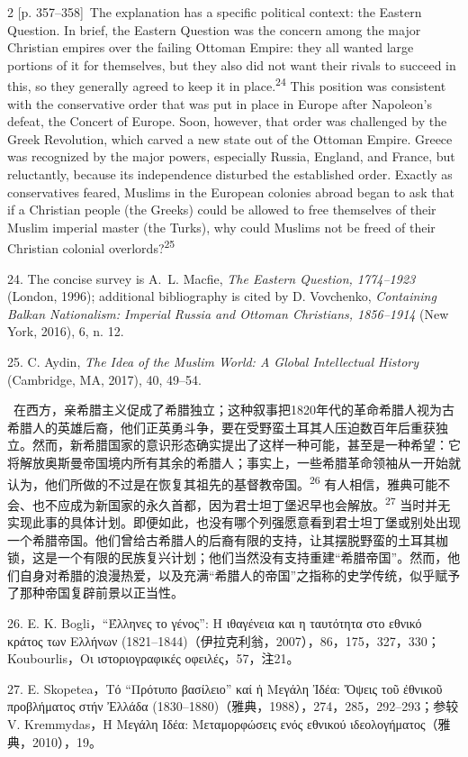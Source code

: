 \documentclass[10pt,a4paper]{article}
\begin{document}
\begin{paracol}{2}
{\scriptsize\color{gray}[p. 357–358]}\ The explanation has a specific political context: the Eastern Question. In brief, the Eastern Question was the concern among the major Christian empires over the failing Ottoman Empire: they all wanted large portions of it for themselves, but they also did not want their rivals to succeed in this, so they generally agreed to keep it in place.\nobreak\textsuperscript{24} This position was consistent with the conservative order that was put in place in Europe after Napoleon’s defeat, the Concert of Europe. Soon, however, that order was challenged by the Greek Revolution, which carved a new state out of the Ottoman Empire. Greece was recognized by the major powers, especially Russia, England, and France, but reluctantly, because its independence disturbed the established order. Exactly as conservatives feared, Muslims in the European colonies abroad began to ask that if a Christian people (the Greeks) could be allowed to free themselves of their Muslim imperial master (the Turks), why could Muslims not be freed of their Christian colonial overlords?\nobreak\textsuperscript{25}\par{\small 24. The concise survey is A. L. Macfie, \textit{The Eastern Question, 1774–1923} (London, 1996); additional bibliography is cited by D. Vovchenko, \textit{Containing Balkan Nationalism: Imperial Russia and Ottoman Christians, 1856–1914 }(New York, 2016), 6, n. 12.\par}{\small 25. C. Aydin, \textit{The Idea of the Muslim World: A Global Intellectual History} (Cambridge, MA, 2017), 40, 49–54.\par}
\switchcolumn*
{\scriptsize\color{gray}[p. 358]}\ 在西方，亲希腊主义促成了希腊独立；这种叙事把1820年代的革命希腊人视为古希腊人的英雄后裔，他们正英勇斗争，要在受野蛮土耳其人压迫数百年后重获独立。然而，新希腊国家的意识形态确实提出了这样一种可能，甚至是一种希望：它将解放奥斯曼帝国境内所有其余的希腊人；事实上，一些希腊革命领袖从一开始就认为，他们所做的不过是在恢复其祖先的基督教帝国。\nobreak\textsuperscript{26} 有人相信，雅典可能不会、也不应成为新国家的永久首都，因为君士坦丁堡迟早也会解放。\nobreak\textsuperscript{27} 当时并无实现此事的具体计划。即便如此，也没有哪个列强愿意看到君士坦丁堡或别处出现一个希腊帝国。他们曾给古希腊人的后裔有限的支持，让其摆脱野蛮的土耳其枷锁，这是一个有限的民族复兴计划；他们当然没有支持重建“希腊帝国”。然而，他们自身对希腊的浪漫热爱，以及充满“希腊人的帝国”之指称的史学传统，似乎赋予了那种帝国复辟前景以正当性。\par{\small 26. E. K. Bogli，“Έλληνες το γένος”: Η ιθαγένεια και η ταυτότητα στο εθνικό κράτος των Ελλήνων (1821–1844)（伊拉克利翁，2007），86，175，327，330；Koubourlis，Οι ιστοριογραφικές οφειλές，57，注21。\par}{\small 27. E. Skopetea，Τό “Πρότυπο βασίλειο” καί ἡ Μεγάλη Ἰδέα: Ὄψεις τοῦ ἐθνικοῦ προβλήματος στήν Ἐλλάδα (1830–1880)（雅典，1988），274，285，292–293；参较 V. Kremmydas，Η Μεγάλη Ιδέα: Μεταμορφώσεις ενός εθνικού ιδεολογήματος（雅典，2010），19。\par}

\end{paracol}
\end{document}
